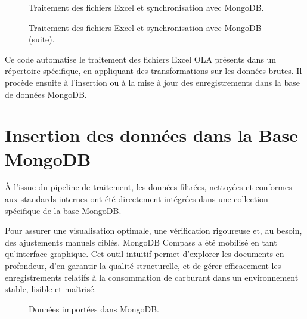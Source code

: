 \documentclass[a4paper,11pt]{report}
\begin{document}
\begin{figure}[H]
  \centering
  \setlength{\fboxrule}{1pt}
  \setlength{\fboxsep}{3pt}
  \caption{Traitement des fichiers Excel et synchronisation avec MongoDB.}
  \label{fig:excel-mongo-1}
\end{figure}

\begin{figure}[H]
  \centering
  \setlength{\fboxrule}{1pt}
  \setlength{\fboxsep}{3pt}
  \caption{Traitement des fichiers Excel et synchronisation avec MongoDB (suite).}
  \label{fig:excel-mongo-2}
\end{figure}

\FloatBarrier

Ce code automatise le traitement des fichiers Excel OLA présents dans un répertoire spécifique, en appliquant des transformations sur les données brutes. Il procède ensuite à l'insertion ou à la mise à jour des enregistrements dans la base de données MongoDB.


\section{Insertion des données dans la Base MongoDB}

À l’issue du pipeline de traitement, les données filtrées, nettoyées et conformes aux standards internes ont été directement intégrées dans une collection spécifique de la base MongoDB.

Pour assurer une visualisation optimale, une vérification rigoureuse et, au besoin, des ajustements manuels ciblés, MongoDB Compass a été mobilisé en tant qu’interface graphique. Cet outil intuitif permet d’explorer les documents en profondeur, d’en garantir la qualité structurelle, et de gérer efficacement les enregistrements relatifs à la consommation de carburant dans un environnement stable, lisible et maîtrisé.

\begin{figure}[H]
  \centering
  \setlength{\fboxrule}{1pt}
  \setlength{\fboxsep}{3pt}
  \caption{Données importées dans MongoDB.}
  \label{fig:import-mongo-db}
\end{figure}
\end{document}
